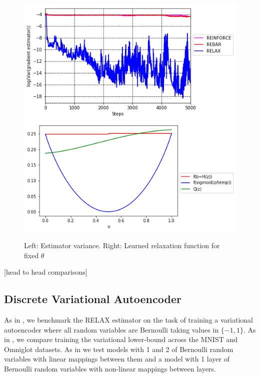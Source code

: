 \documentclass{article}
\begin{document}
\begin{figure}
\begin{center}
\includegraphics[scale=.33]{figures/variance_no_opt}
\includegraphics[scale=.33]{figures/learned_r}
\label{fig:toy_var}
\end{center}
\caption{Left: Estimator variance. Right: Learned relaxation function for fixed $\theta$}
\end{figure}
[head to head comparisons] 

\subsection{Discrete Variational Autoencoder}
As in \citep{tucker2017rebar}, we benchmark the RELAX estimator on the task of training a variational autoencoder \cite{VAE} where all random variables are Bernoulli taking values in $\{-1, 1\}$. As in \cite{tucker2017rebar}, we compare training the variational lower-bound across the MNIST \cite{MNIST} and Omniglot \cite{OMNIGLOT} datasets. As in \cite{tucker2017rebar} we test models with 1 and 2 of Bernoulli random variables with linear mappings between them and a model with 1 layer of Bernoulli random variables with non-linear mappings between layers.
\end{document}
